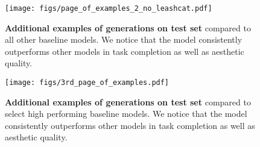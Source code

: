 \begin{figure}[!h]
    \centering
    \texttt{[image: figs/page\_of\_examples\_2\_no\_leashcat.pdf]}
    \caption{\textbf{Additional examples of \ours generations on \ours test set} compared to all other baseline models. We notice that the \ours model consistently outperforms other models in task completion as well as aesthetic quality.}
    \label{fig:generation_examples_2}
\end{figure}

\begin{figure*}[!htbp]
    \centering
    \texttt{[image: figs/3rd\_page\_of\_examples.pdf]}
    \caption{\textbf{Additional examples of \ours generations on \ours test set} compared to select high performing baseline models. We notice that the \ours model consistently outperforms other models in task completion as well as aesthetic quality.}
    \label{fig:generation_examples_3}
\end{figure*}

\twocolumn
% 